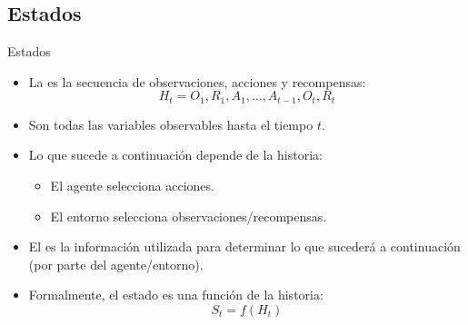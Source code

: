 \documentclass[10pt, envcountsect, handout, aspectratio=1610, hyperref={hypertexnames=true}]{beamer}
\begin{document}
\subsection{Estados}

\begin{frame}{Estados}
\begin{itemize}
  \item La  es la secuencia de observaciones, acciones y recompensas:
  \begin{equation*}
    H_t = O_1, R_1, A_1, \dots, A_{t-1}, O_t, R_t
  \end{equation*}
  \item Son todas las variables observables hasta el tiempo \( t \).
  \item Lo que sucede a continuación depende de la historia:
  \begin{itemize}
    \item El agente selecciona acciones.
    \item El entorno selecciona observaciones/recompensas.
  \end{itemize}
  \item El  es la información utilizada para determinar lo que sucederá a continuación (por parte del agente/entorno).
  \item Formalmente, el estado es una función de la historia:
  \begin{equation*}
    S_t = f(H_t)
  \end{equation*} 
\end{itemize}



\end{frame}
\end{document}
